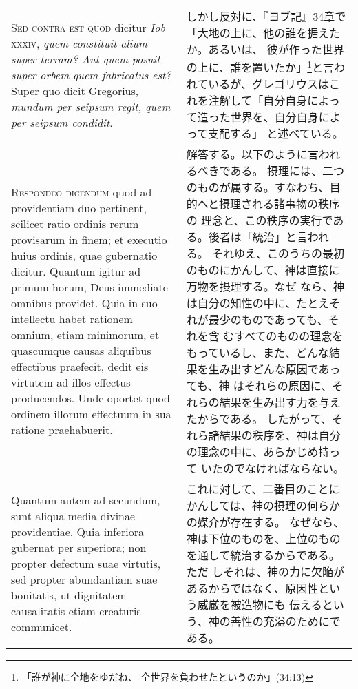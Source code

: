 \documentclass[10pt]{jsarticle} %
\begin{document}
\begin{longtable}{p{21em}p{21em}}
{\scshape Sed contra est quod} dicitur {\itshape Iob} {\scshape xxxiv}, {\itshape quem
constituit alium super terram? Aut quem posuit super orbem quem
fabricatus est?} Super quo dicit Gregorius, {\itshape mundum per seipsum regit,
quem per seipsum condidit}.

&

しかし反対に、『ヨブ記』34章で「大地の上に、他の誰を据えたか。あるいは、
 彼が作った世界の上に、誰を置いたか」\footnote{「誰が神に全地をゆだね、
 全世界を負わせたというのか」(34:13)}と言われているが、グレゴリウスはこ
 れを注解して「自分自身によって造った世界を、自分自身によって支配する」
 と述べている。
 
\\


{\scshape Respondeo dicendum} quod ad providentiam duo
pertinent, scilicet ratio ordinis rerum provisarum in finem; et executio
huius ordinis, quae gubernatio dicitur. Quantum igitur ad primum horum,
Deus immediate omnibus providet. Quia in suo intellectu habet rationem
omnium, etiam minimorum, et quascumque causas aliquibus effectibus
praefecit, dedit eis virtutem ad illos effectus producendos. Unde
oportet quod ordinem illorum effectuum in sua ratione
praehabuerit. 


&

解答する。以下のように言われるべきである。
摂理には、二つのものが属する。すなわち、目的へと摂理される諸事物の秩序の
 理念と、この秩序の実行である。後者は「統治」と言われる。
それゆえ、このうちの最初のものにかんして、神は直接に万物を摂理する。なぜ
 なら、神は自分の知性の中に、たとえそれが最少のものであっても、それを含
 むすべてのものの理念をもっているし、また、どんな結果を生み出すどんな原因であっても、神
 はそれらの原因に、それらの結果を生み出す力を与えたからである。
したがって、それら諸結果の秩序を、神は自分の理念の中に、あらかじめ持って
 いたのでなければならない。


\\


Quantum autem ad secundum, sunt aliqua media divinae
providentiae. Quia inferiora gubernat per superiora; non propter
defectum suae virtutis, sed propter abundantiam suae bonitatis, ut
dignitatem causalitatis etiam creaturis communicet. 



&

これに対して、二番目のことにかんしては、神の摂理の何らかの媒介が存在する。
 なぜなら、神は下位のものを、上位のものを通して統治するからである。ただ
 しそれは、神の力に欠陥があるからではなく、原因性という威厳を被造物にも
 伝えるという、神の善性の充溢のためにである。




\end{longtable}
\end{document}
